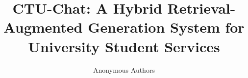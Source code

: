 \documentclass[runningheads]{llncs}
\begin{document}
\title{CTU-Chat: A Hybrid Retrieval-Augmented Generation System
       for University Student Services}

\author{Anonymous Authors}

\maketitle











\end{document}
